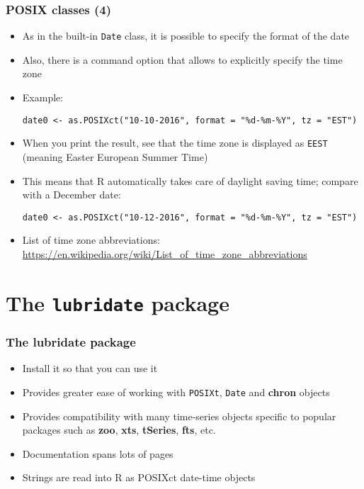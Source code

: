 \documentclass[10pt]{beamer}
\theoremstyle{definition}
\begin{document}
\begin{frame}[fragile]
\frametitle{POSIX classes (4)}
\begin{itemize}
	\item As in the built-in \texttt{Date} class, it is possible to specify the format of the date
	\item Also, there is a command option that allows to explicitly specify the time zone
	\item Example:
	\begin{lstlisting}[style = rstyle, breaklines]
	date0 <- as.POSIXct("10-10-2016", format = "%d-%m-%Y", tz = "EST")
	\end{lstlisting}
	\item When you print the result, see that the time zone is displayed as \texttt{EEST} (meaning Easter European Summer Time)
	\item This means that R automatically takes care of daylight saving time; compare with a December date:
	\begin{lstlisting}[style = rstyle, breaklines]
	date0 <- as.POSIXct("10-12-2016", format = "%d-%m-%Y", tz = "EST")
	\end{lstlisting}
	\item List of time zone abbreviations: \url{https://en.wikipedia.org/wiki/List_of_time_zone_abbreviations}
\end{itemize}
\end{frame}

\section{The \texttt{lubridate} package}
\begin{frame}[fragile]
\frametitle{The \textbf{lubridate} package}
\begin{itemize}
	\item Install it so that you can use it
	\item Provides greater ease of working with \texttt{POSIXt}, \texttt{Date} and \textbf{chron} objects
	\item Provides compatibility with many time-series objects specific to popular packages such as \textbf{zoo}, \textbf{xts}, \textbf{tSeries}, \textbf{fts}, etc.
	\item Documentation spans lots of pages
	\item Strings are read into R as POSIXct date-time objects
\end{itemize}
\end{frame}
\end{document}
